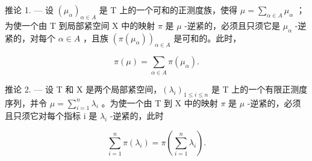 推论 1. --- 设 \((\mu_{\alpha})_{\alpha \in A}\) 是 T 上的一个可和的正测度族，使得 \(\mu = \sum_{\alpha \in A} \mu_{\alpha}\) ；为使一个由 T 到局部紧空间 X 中的映射 \(\pi\) 是 \(\mu\) -逆紧的，必须且只须它是 \(\mu_{\alpha}\) -逆紧的，对每个 \(\alpha \in A\) ，且族 \((\pi(\mu_{\alpha}))_{\alpha \in A}\) 是可和的。此时，

\[
\pi (\mu) = \sum_ {\alpha \in A} \pi (\mu_ {\alpha}).\tag{6}
\]

推论 2. --- 设 T 和 X 是两个局部紧空间，\((\lambda_{i})_{1\leqslant i\leqslant n}\) 是 T 上的一个有限正测度序列，并令 \(\mu=\sum_{i=1}^{n}\lambda_{i}\) 。为使一个由 T 到 X 中的映射 \(\pi\) 是 \(\mu\) -逆紧的，必须且只须它对每个指标 i 是 \(\lambda_{i}\) -逆紧的，此时

\[
\sum_ {i = 1} ^ {n} \pi (\lambda_ {i}) = \pi \left(\sum_ {i = 1} ^ {n} \lambda_ {i}\right).
\]

